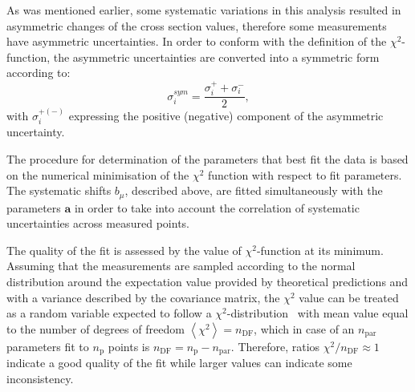 As was mentioned earlier, some systematic variations in this analysis resulted in asymmetric changes of the cross section values, therefore some measurements have asymmetric uncertainties. In order to conform with the definition of the $\chi^2$-function, the asymmetric uncertainties are converted into a symmetric form according to:
\begin{equation}
 \sigma_i^{sym} = \frac{\sigma_i^+ + \sigma_i^-}{2},
\end{equation}
with $\sigma_i^{+\left(-\right)}$ expressing the positive (negative) component of the asymmetric uncertainty.

The procedure for determination of the parameters that best fit the data is based on the numerical minimisation of the $\chi^2$ function with respect to fit parameters. The systematic shifts $b_\mu$, described above, are fitted simultaneously with the parameters $\mathbf{a}$ in order to take into account the correlation of systematic uncertainties across measured points.

The quality of the fit is assessed by the value of $\chi^2$-function at its minimum. Assuming that the measurements are sampled according to the normal distribution around the expectation value provided by theoretical predictions and with a variance described by the covariance matrix, the $\chi^2$ value can be treated as a random variable expected to follow a $\chi^2$-distribution~\cite{PDG:2014}
with mean value equal to the number of degrees of freedom $\left\langle \chi^2 \right\rangle = n_\text{DF}$, which in case of an $n_\text{par}$ parameters fit to $n_\text{p}$ points is $n_\text{DF}=n_\text{p}-n_\text{par}$.
Therefore, ratios $\chi^2/n_\text{DF} \approx 1$ indicate a good quality of the fit while larger values can indicate some inconsistency.
